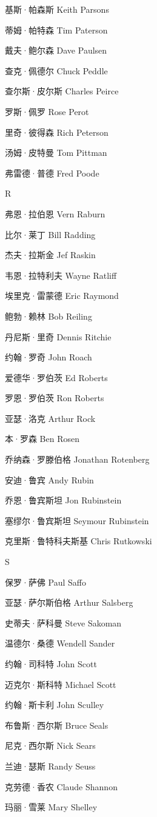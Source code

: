 \documentclass[12pt,UTF8]{ctexbook}
\begin{document}
基斯·帕森斯 Keith Parsons

蒂姆·帕特森 Tim Paterson

戴夫·鲍尔森 Dave Paulsen

查克·佩德尔 Chuck Peddle

查尔斯·皮尔斯 Charles Peirce

罗斯·佩罗 Rose Perot

里奇·彼得森 Rich Peterson

汤姆·皮特曼 Tom Pittman

弗雷德·普德 Fred Poode

R

弗恩·拉伯恩 Vern Raburn

比尔·莱丁 Bill Radding

杰夫·拉斯金 Jef Raskin

韦恩·拉特利夫 Wayne Ratliff

埃里克·雷蒙德 Eric Raymond

鲍勃·赖林 Bob Reiling

丹尼斯·里奇 Dennis Ritchie

约翰·罗奇 John Roach

爱德华·罗伯茨 Ed Roberts

罗恩·罗伯茨 Ron Roberts

亚瑟·洛克 Arthur Rock

本·罗森 Ben Rosen

乔纳森·罗滕伯格 Jonathan Rotenberg

安迪·鲁宾 Andy Rubin

乔恩·鲁宾斯坦 Jon Rubinstein

塞缪尔·鲁宾斯坦 Seymour Rubinstein

克里斯·鲁特科夫斯基 Chris Rutkowski

S

保罗·萨佛 Paul Saffo

亚瑟·萨尔斯伯格 Arthur Salsberg

史蒂夫·萨科曼 Steve Sakoman

温德尔·桑德 Wendell Sander

约翰·司科特 John Scott

迈克尔·斯科特 Michael Scott

约翰·斯卡利 John Sculley

布鲁斯·西尔斯 Bruce Seals

尼克·西尔斯 Nick Sears

兰迪·瑟斯 Randy Seuss

克劳德·香农 Claude Shannon

玛丽·雪莱 Mary Shelley
\end{document}
